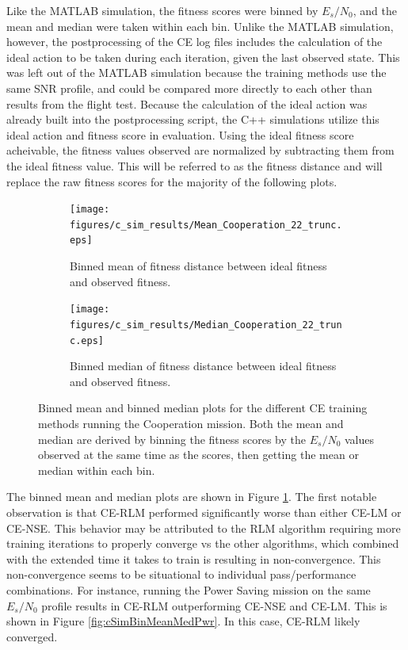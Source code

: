 \par Like the MATLAB simulation, the fitness scores were binned by $E_s/N_0$, and the mean and median were taken within each bin. Unlike the MATLAB simulation, however, the postprocessing of the CE log files includes the calculation of the ideal action to be taken during each iteration, given the last observed state. This was left out of the MATLAB simulation because the training methods use the same SNR profile, and could be compared more directly to each other than results from the flight test. Because the calculation of the ideal action was already built into the postprocessing script, the C++ simulations utilize this ideal action and fitness score in evaluation. Using the ideal fitness score acheivable, the fitness values observed are normalized by subtracting them from the ideal fitness value. This will be referred to as the fitness distance and will replace the raw fitness scores for the majority of the following plots.
\begin{figure}[ht]
\centering
\begin{subfigure}{0.48\linewidth}
\centering
\texttt{[image: figures/c\_sim\_results/Mean\_Cooperation\_22\_trunc.eps]}
\caption{Binned mean of fitness distance between ideal fitness and observed fitness.}
\end{subfigure}\hfill%
\begin{subfigure}{0.48\linewidth}
\centering
\texttt{[image: figures/c\_sim\_results/Median\_Cooperation\_22\_trunc.eps]}
\caption{Binned median of fitness distance between ideal fitness and observed fitness.}
\end{subfigure}
\caption{Binned mean and binned median plots for the different CE training methods running the Cooperation mission. Both the mean and median are derived by binning the fitness scores by the $E_s/N_0$ values observed at the same time as the scores, then getting the mean or median within each bin.} \label{fig:cSimBinMeanMedCoop}
\end{figure}


\par The binned mean and median plots are shown in Figure \ref{fig:cSimBinMeanMedCoop}. The first notable observation is that CE-RLM performed significantly worse than either CE-LM or CE-NSE. This behavior may be attributed to the RLM algorithm requiring more training iterations to properly converge vs the other algorithms, which combined with the extended time it takes to train is resulting in non-convergence. %
This non-convergence seems to be situational to individual pass/performance combinations. For instance, running the Power Saving mission on the same $E_s/N_0$ profile results in CE-RLM outperforming CE-NSE and CE-LM. This is shown in Figure \ref{fig:cSimBinMeanMedPwr}. In this case, CE-RLM likely converged.   


